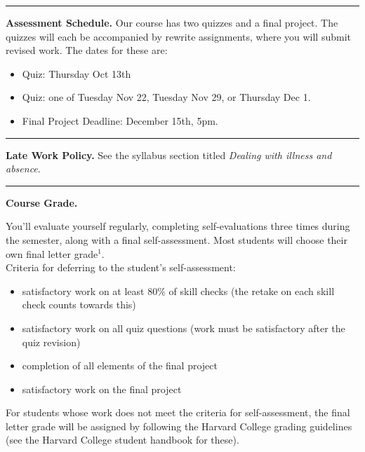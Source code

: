 \documentclass[12pt,letterpaper]{exam}
\begin{document}
\vspace{0.5cm}
\hrule
\vspace{0.5cm}

\noindent\textbf{Assessment Schedule.}
Our course has two quizzes and a final project.  The quizzes will each be accompanied by rewrite assignments, where you will submit revised work.  The dates for these are:
\begin{itemize}
\itemsep0pt
\item Quiz:	Thursday Oct 13th
\item Quiz:	one of Tuesday Nov 22, Tuesday Nov 29, or Thursday Dec 1.
\item Final Project Deadline: December 15th, 5pm.
\end{itemize}

\vspace{0.5cm}
\hrule
\vspace{0.5cm}

\noindent\textbf{Late Work Policy.}  See the syllabus section titled \emph{Dealing with illness and absence}.

\vspace{0.5cm}
\hrule
\vspace{0.5cm}

\noindent\textbf{Course Grade.}

You'll evaluate yourself regularly, completing self-evaluations three times during the semester, along with a final self-assessment.  Most students will choose their own final letter grade$^1$. \\

\noindent Criteria for deferring to the student's self-assessment:
\begin{itemize}
\itemsep0pt
    \item satisfactory work on at least 80\% of skill checks (the retake on each skill check counts towards this)
    \item satisfactory work on all quiz questions (work must be satisfactory after the quiz revision)
    \item completion of all elements of the final project
    \item satisfactory work on the final project
\end{itemize}

For students whose work does not meet the criteria for self-assessment, the final letter grade will be assigned by following the Harvard College grading guidelines (see the Harvard College student handbook for these). 

\end{document}
